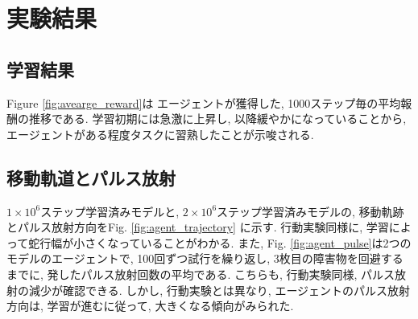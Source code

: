 \documentclass[../main]{subfiles}
\begin{document}
\section{実験結果}
\subsection{学習結果}
Figure \ref{fig:avearge_reward}は
エージェントが獲得した, 
1000ステップ毎の平均報酬の推移である.
学習初期には急激に上昇し, 以降緩やかになっていることから, 
エージェントがある程度タスクに習熟したことが示唆される.

\subsection{移動軌道とパルス放射}
$1\times 10^6$ステップ学習済みモデルと, 
$2\times 10^6$ステップ学習済みモデルの,
移動軌跡とパルス放射方向をFig. \ref{fig:agent_trajectory}
に示す.
行動実験同様に, 学習によって蛇行幅が小さくなっていることがわかる.
また, Fig. \ref{fig:agent_pulse}は2つのモデルのエージェントで, 
100回ずつ試行を繰り返し, 3枚目の障害物を回避するまでに, 
発したパルス放射回数の平均である.
こちらも, 行動実験同様, パルス放射の減少が確認できる.
しかし, 行動実験とは異なり, エージェントのパルス放射方向は, 
学習が進むに従って, 大きくなる傾向がみられた.
\end{document}
